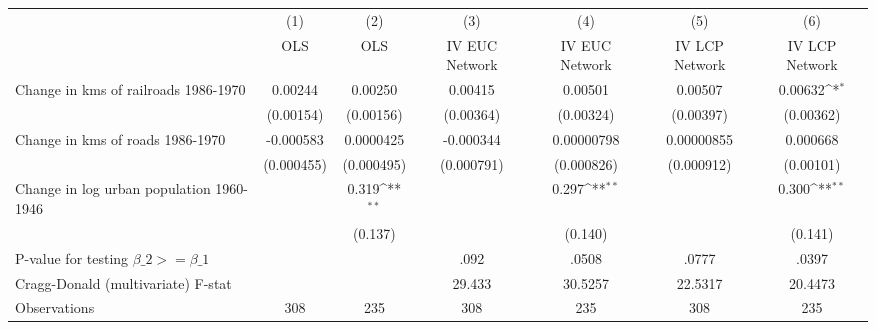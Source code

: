 {
\def\sym#1{\ifmmode^{#1}\else\(^{#1}\)\fi}
\begin{tabular}{l*{6}{c}}
\hline\hline
                &\multicolumn{1}{c}{(1)}&\multicolumn{1}{c}{(2)}&\multicolumn{1}{c}{(3)}&\multicolumn{1}{c}{(4)}&\multicolumn{1}{c}{(5)}&\multicolumn{1}{c}{(6)}\\
                &\multicolumn{1}{c}{OLS}&\multicolumn{1}{c}{OLS}&\multicolumn{1}{c}{IV EUC Network}&\multicolumn{1}{c}{IV EUC Network}&\multicolumn{1}{c}{IV LCP Network}&\multicolumn{1}{c}{IV LCP Network}\\
\hline
Change in kms of railroads 1986-1970&  0.00244         &  0.00250         &  0.00415         &  0.00501         &  0.00507         &  0.00632\sym{*}  \\
                &(0.00154)         &(0.00156)         &(0.00364)         &(0.00324)         &(0.00397)         &(0.00362)         \\
[1em]
Change in kms of roads 1986-1970&-0.000583         &0.0000425         &-0.000344         &0.00000798         &0.00000855         & 0.000668         \\
                &(0.000455)         &(0.000495)         &(0.000791)         &(0.000826)         &(0.000912)         &(0.00101)         \\
[1em]
Change in log urban population 1960-1946&                  &    0.319\sym{**} &                  &    0.297\sym{**} &                  &    0.300\sym{**} \\
                &                  &  (0.137)         &                  &  (0.140)         &                  &  (0.141)         \\
\hline
P-value for testing $\beta\_{2} >= \beta\_{1}$&                  &                  &     .092         &    .0508         &    .0777         &    .0397         \\
Cragg-Donald (multivariate) F-stat&                  &                  &   29.433         &  30.5257         &  22.5317         &  20.4473         \\
Observations    &      308         &      235         &      308         &      235         &      308         &      235         \\
\hline\hline
\end{tabular}
}
